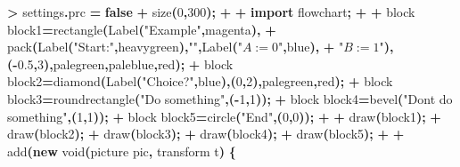 \documentclass[
]{article}
\newenvironment{Shaded}{\begin{snugshade}}{\end{snugshade}}
\newcommand{\DataTypeTok}[1]{\textcolor[rgb]{0.13,0.29,0.53}{#1}}
\newcommand{\DecValTok}[1]{\textcolor[rgb]{0.00,0.00,0.81}{#1}}
\newcommand{\FloatTok}[1]{\textcolor[rgb]{0.00,0.00,0.81}{#1}}
\newcommand{\KeywordTok}[1]{\textcolor[rgb]{0.13,0.29,0.53}{\textbf{#1}}}
\newcommand{\NormalTok}[1]{#1}
\newcommand{\OperatorTok}[1]{\textcolor[rgb]{0.81,0.36,0.00}{\textbf{#1}}}
\newcommand{\StringTok}[1]{\textcolor[rgb]{0.31,0.60,0.02}{#1}}
\begin{document}
\begin{Shaded}
\begin{Highlighting}[]
\OperatorTok{\textgreater{}}\NormalTok{ settings}\OperatorTok{.}\NormalTok{prc }\OperatorTok{=} \KeywordTok{false}
\OperatorTok{+}\NormalTok{ size}\OperatorTok{(}\DecValTok{0}\OperatorTok{,}\DecValTok{300}\OperatorTok{);}
\OperatorTok{+} 
\OperatorTok{+} \KeywordTok{import}\NormalTok{ flowchart}\OperatorTok{;}
\OperatorTok{+} 
\OperatorTok{+}\NormalTok{ block block1}\OperatorTok{=}\NormalTok{rectangle}\OperatorTok{(}\NormalTok{Label}\OperatorTok{(}\StringTok{"Example"}\OperatorTok{,}\NormalTok{magenta}\OperatorTok{),}
\OperatorTok{+}\NormalTok{                        pack}\OperatorTok{(}\NormalTok{Label}\OperatorTok{(}\StringTok{"Start:"}\OperatorTok{,}\NormalTok{heavygreen}\OperatorTok{),}\StringTok{""}\OperatorTok{,}\NormalTok{Label}\OperatorTok{(}\StringTok{"$A:=0$"}\OperatorTok{,}\NormalTok{blue}\OperatorTok{),}
\OperatorTok{+}                             \StringTok{"$B:=1$"}\OperatorTok{),({-}}\FloatTok{0.5}\OperatorTok{,}\DecValTok{3}\OperatorTok{),}\NormalTok{palegreen}\OperatorTok{,}\NormalTok{paleblue}\OperatorTok{,}\NormalTok{red}\OperatorTok{);}
\OperatorTok{+}\NormalTok{ block block2}\OperatorTok{=}\NormalTok{diamond}\OperatorTok{(}\NormalTok{Label}\OperatorTok{(}\StringTok{"Choice?"}\OperatorTok{,}\NormalTok{blue}\OperatorTok{),(}\DecValTok{0}\OperatorTok{,}\DecValTok{2}\OperatorTok{),}\NormalTok{palegreen}\OperatorTok{,}\NormalTok{red}\OperatorTok{);}
\OperatorTok{+}\NormalTok{ block block3}\OperatorTok{=}\NormalTok{roundrectangle}\OperatorTok{(}\StringTok{"Do something"}\OperatorTok{,({-}}\DecValTok{1}\OperatorTok{,}\DecValTok{1}\OperatorTok{));}
\OperatorTok{+}\NormalTok{ block block4}\OperatorTok{=}\NormalTok{bevel}\OperatorTok{(}\StringTok{"Don\textquotesingle{}t do something"}\OperatorTok{,(}\DecValTok{1}\OperatorTok{,}\DecValTok{1}\OperatorTok{));}
\OperatorTok{+}\NormalTok{ block block5}\OperatorTok{=}\NormalTok{circle}\OperatorTok{(}\StringTok{"End"}\OperatorTok{,(}\DecValTok{0}\OperatorTok{,}\DecValTok{0}\OperatorTok{));}
\OperatorTok{+} 
\OperatorTok{+}\NormalTok{ draw}\OperatorTok{(}\NormalTok{block1}\OperatorTok{);}
\OperatorTok{+}\NormalTok{ draw}\OperatorTok{(}\NormalTok{block2}\OperatorTok{);}
\OperatorTok{+}\NormalTok{ draw}\OperatorTok{(}\NormalTok{block3}\OperatorTok{);}
\OperatorTok{+}\NormalTok{ draw}\OperatorTok{(}\NormalTok{block4}\OperatorTok{);}
\OperatorTok{+}\NormalTok{ draw}\OperatorTok{(}\NormalTok{block5}\OperatorTok{);}
\OperatorTok{+} 
\OperatorTok{+}\NormalTok{ add}\OperatorTok{(}\KeywordTok{new} \DataTypeTok{void}\OperatorTok{(}\NormalTok{picture pic}\OperatorTok{,}\NormalTok{ transform t}\OperatorTok{)} \OperatorTok{\{}

\end{Highlighting}
\end{Shaded}
\end{document}
